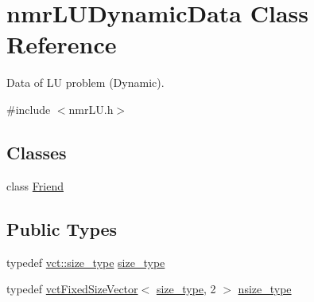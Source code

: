 \hypertarget{classnmr_l_u_dynamic_data}{}\section{nmr\+L\+U\+Dynamic\+Data Class Reference}
\label{classnmr_l_u_dynamic_data}


Data of L\+U problem (Dynamic).  




{\ttfamily \#include $<$nmr\+L\+U.\+h$>$}

\subsection*{Classes}
\begin{DoxyCompactItemize}
\item 
class \hyperlink{classnmr_l_u_dynamic_data_1_1_friend}{Friend}
\end{DoxyCompactItemize}
\subsection*{Public Types}
\begin{DoxyCompactItemize}
\item 
typedef \hyperlink{namespacevct_a3e2935e13aac4500965e00d30565775b}{vct\+::size\+\_\+type} \hyperlink{classnmr_l_u_dynamic_data_a63259a289f8f94498b5102ce39722bbe}{size\+\_\+type}
\item 
typedef \hyperlink{classvct_fixed_size_vector}{vct\+Fixed\+Size\+Vector}$<$ \hyperlink{classnmr_l_u_dynamic_data_a63259a289f8f94498b5102ce39722bbe}{size\+\_\+type}, 2 $>$ \hyperlink{classnmr_l_u_dynamic_data_a5b722c87d1d635328893aa3f54ac35a1}{nsize\+\_\+type}
\end{DoxyCompactItemize}
